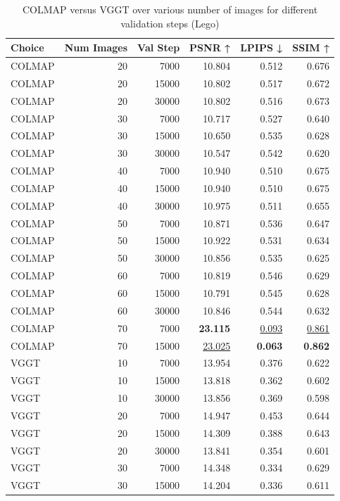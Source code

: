 \begin{table}[H]
\caption{COLMAP versus VGGT over various number of images for different validation steps (Lego)}
\label{tab:01_num_images_30000_lego}
\begin{tabular}{lrrrrr}
\toprule
Choice & Num Images & Val Step & PSNR ↑ & LPIPS ↓ & SSIM ↑ \\
\midrule
COLMAP & 20 & 7000 & 10.804 & 0.512 & 0.676 \\
COLMAP & 20 & 15000 & 10.802 & 0.517 & 0.672 \\
COLMAP & 20 & 30000 & 10.802 & 0.516 & 0.673 \\
COLMAP & 30 & 7000 & 10.717 & 0.527 & 0.640 \\
COLMAP & 30 & 15000 & 10.650 & 0.535 & 0.628 \\
COLMAP & 30 & 30000 & 10.547 & 0.542 & 0.620 \\
COLMAP & 40 & 7000 & 10.940 & 0.510 & 0.675 \\
COLMAP & 40 & 15000 & 10.940 & 0.510 & 0.675 \\
COLMAP & 40 & 30000 & 10.975 & 0.511 & 0.655 \\
COLMAP & 50 & 7000 & 10.871 & 0.536 & 0.647 \\
COLMAP & 50 & 15000 & 10.922 & 0.531 & 0.634 \\
COLMAP & 50 & 30000 & 10.856 & 0.535 & 0.625 \\
COLMAP & 60 & 7000 & 10.819 & 0.546 & 0.629 \\
COLMAP & 60 & 15000 & 10.791 & 0.545 & 0.628 \\
COLMAP & 60 & 30000 & 10.846 & 0.544 & 0.632 \\
COLMAP & 70 & 7000 & \textbf{23.115} & \underline{0.093} & \underline{0.861} \\
COLMAP & 70 & 15000 & \underline{23.025} & \textbf{0.063} & \textbf{0.862} \\
VGGT & 10 & 7000 & 13.954 & 0.376 & 0.622 \\
VGGT & 10 & 15000 & 13.818 & 0.362 & 0.602 \\
VGGT & 10 & 30000 & 13.856 & 0.369 & 0.598 \\
VGGT & 20 & 7000 & 14.947 & 0.453 & 0.644 \\
VGGT & 20 & 15000 & 14.309 & 0.388 & 0.643 \\
VGGT & 20 & 30000 & 13.841 & 0.354 & 0.601 \\
VGGT & 30 & 7000 & 14.348 & 0.334 & 0.629 \\
VGGT & 30 & 15000 & 14.204 & 0.336 & 0.611 \\

\end{tabular}
\end{table}
